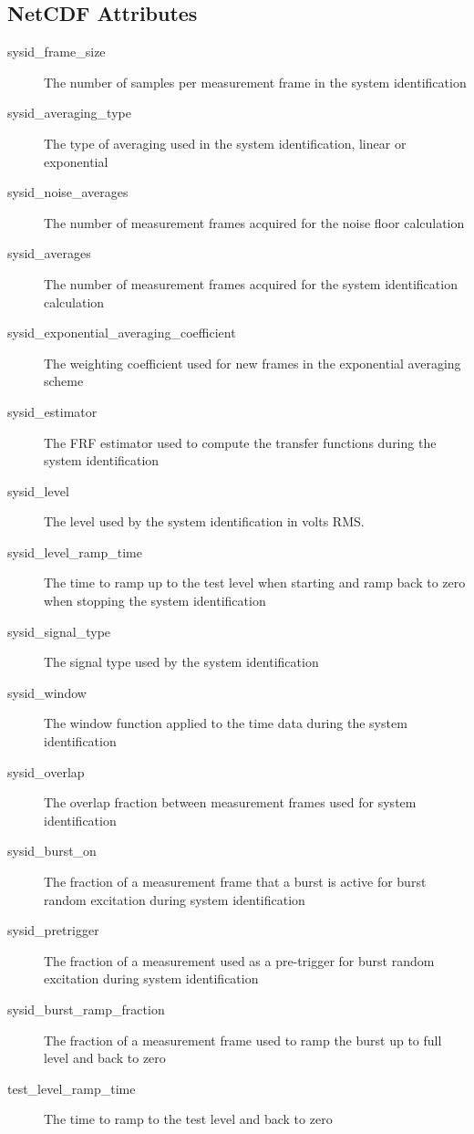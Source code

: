 \documentclass[pdf,12pt,report]{SANDreport}
\begin{document}
    \subsection{NetCDF Attributes}
    \begin{description}
        \item[sysid\_frame\_size] The number of samples per measurement frame in the system identification
        \item[sysid\_averaging\_type] The type of averaging used in the system identification, linear or exponential
        \item[sysid\_noise\_averages] The number of measurement frames acquired for the noise floor calculation
        \item[sysid\_averages] The number of measurement frames acquired for the system identification calculation
        \item[sysid\_exponential\_averaging\_coefficient] The weighting coefficient used for new frames in the exponential averaging scheme
        \item[sysid\_estimator] The \Ac{FRF} estimator used to compute the transfer functions during the system identification
        \item[sysid\_level] The level used by the system identification in volts RMS.
        \item[sysid\_level\_ramp\_time] The time to ramp up to the test level when starting and ramp back to zero when stopping the system identification
        \item[sysid\_signal\_type] The signal type used by the system identification
        \item[sysid\_window] The window function applied to the time data during the system identification
        \item[sysid\_overlap] The overlap fraction between measurement frames used for system identification
        \item[sysid\_burst\_on] The fraction of a measurement frame that a burst is active for burst random excitation during system identification
        \item[sysid\_pretrigger] The fraction of a measurement used as a pre-trigger for burst random excitation during system identification
        \item[sysid\_burst\_ramp\_fraction] The fraction of a measurement frame used to ramp the burst up to full level and back to zero
        \item[test\_level\_ramp\_time] The time to ramp to the test level and back to zero

\end{description}
\end{document}
